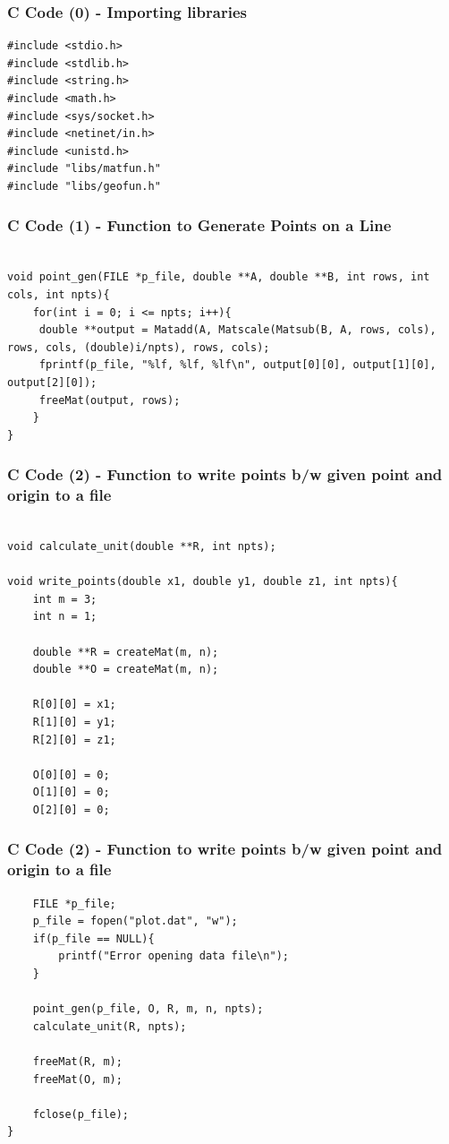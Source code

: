 \documentclass{beamer}
\begin{document}
\begin{frame}[fragile]
    \frametitle{C Code (0) - Importing libraries}

    \begin{lstlisting}
#include <stdio.h>
#include <stdlib.h>
#include <string.h>
#include <math.h>
#include <sys/socket.h>
#include <netinet/in.h>
#include <unistd.h>
#include "libs/matfun.h"
#include "libs/geofun.h"
    \end{lstlisting}
\end{frame}
\begin{frame}[fragile]
    \frametitle{C Code (1) - Function to Generate Points on a Line}

    \begin{lstlisting}

void point_gen(FILE *p_file, double **A, double **B, int rows, int cols, int npts){
    for(int i = 0; i <= npts; i++){
     double **output = Matadd(A, Matscale(Matsub(B, A, rows, cols), rows, cols, (double)i/npts), rows, cols);
     fprintf(p_file, "%lf, %lf, %lf\n", output[0][0], output[1][0], output[2][0]);
     freeMat(output, rows);
    }
}

    \end{lstlisting}
\end{frame}


\begin{frame}[fragile]
    \frametitle{C Code (2) - Function to write points b/w given point and origin to a file}

    \begin{lstlisting}

void calculate_unit(double **R, int npts);

void write_points(double x1, double y1, double z1, int npts){
    int m = 3;
    int n = 1;

    double **R = createMat(m, n);
    double **O = createMat(m, n);

    R[0][0] = x1;
    R[1][0] = y1;
    R[2][0] = z1;

    O[0][0] = 0;
    O[1][0] = 0;
    O[2][0] = 0;
    \end{lstlisting}
\end{frame}
\begin{frame}[fragile]
    \frametitle{C Code (2) - Function to write points b/w given point and origin to a file}

    \begin{lstlisting}
    FILE *p_file;
    p_file = fopen("plot.dat", "w");
    if(p_file == NULL){
        printf("Error opening data file\n");
    }

    point_gen(p_file, O, R, m, n, npts);
    calculate_unit(R, npts);

    freeMat(R, m);
    freeMat(O, m);

    fclose(p_file);
}

    \end{lstlisting}
\end{frame}
\end{document}
